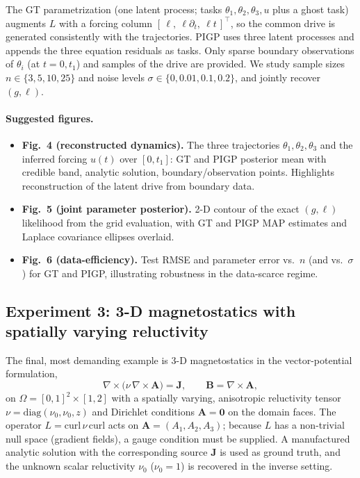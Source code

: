 The GT parametrization (one latent process; tasks
$\theta_1,\theta_2,\theta_3,u$ plus a ghost task) augments $L$ with a
forcing column $[\,\ell,\ \ell\partial_t,\ \ell t\,]^{\top}$, so the
common drive is generated consistently with the trajectories.  PIGP uses
three latent processes and appends the three equation residuals as
tasks.  Only sparse boundary observations of $\theta_i$ (at $t=0,t_1$)
and samples of the drive are provided.  We study sample sizes
$n\in\{3,5,10,25\}$ and noise levels
$\sigma\in\{0,0.01,0.1,0.2\}$, and jointly recover $(g,\ell)$.

\paragraph{Suggested figures.}
\begin{itemize}
  \item \textbf{Fig.~4 (reconstructed dynamics).} The three trajectories
        $\theta_1,\theta_2,\theta_3$ and the inferred forcing $u(t)$ over
        $[0,t_1]$: GT and PIGP posterior mean with credible band,
        analytic solution, boundary/observation points. Highlights
        reconstruction of the latent drive from boundary data.
  \item \textbf{Fig.~5 (joint parameter posterior).} 2-D contour of the
        exact $(g,\ell)$ likelihood from the grid evaluation, with GT and
        PIGP MAP estimates and Laplace covariance ellipses overlaid.
  \item \textbf{Fig.~6 (data-efficiency).} Test RMSE and parameter error
        vs.\ $n$ (and vs.\ $\sigma$) for GT and PIGP, illustrating
        robustness in the data-scarce regime.
\end{itemize}

\subsection{Experiment 3: 3-D magnetostatics with spatially varying
            reluctivity}
\label{sec:ex3}

The final, most demanding example is 3-D magnetostatics in the
vector-potential formulation,
\begin{equation}
  \nabla\times\!\bigl(\nu\,\nabla\times\bm{A}\bigr) = \bm{J},
  \qquad
  \bm{B}=\nabla\times\bm{A},
  \label{eq:ex3-pde}
\end{equation}
on $\Omega=[0,1]^2\times[1,2]$ with a spatially varying, anisotropic
reluctivity tensor $\nu=\mathrm{diag}(\nu_0,\nu_0,z)$ and Dirichlet
conditions $\bm{A}=\bm{0}$ on the domain faces.  The operator
$L=\mathrm{curl}\,\nu\,\mathrm{curl}$ acts on $\bm{A}=(A_1,A_2,A_3)$;
because $L$ has a non-trivial null space (gradient fields), a gauge
condition must be supplied.  A manufactured analytic solution with the
corresponding source $\bm{J}$ is used as ground truth, and the unknown
scalar reluctivity $\nu_0$ ($\nu_0=1$) is recovered in the inverse
setting.

